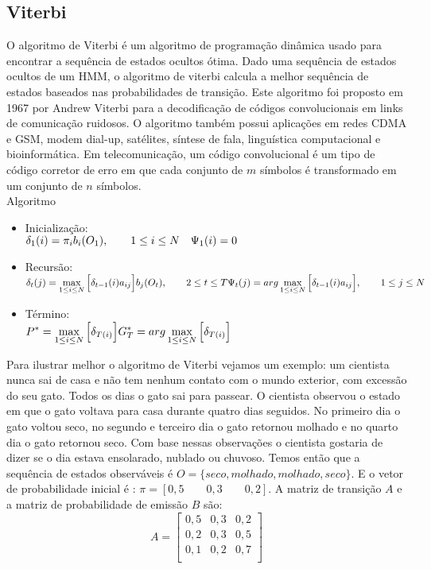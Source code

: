 \subsection{Viterbi}
\label{secViterbi}
O algoritmo de Viterbi é um algoritmo de programação dinâmica usado para encontrar a sequência de estados ocultos ótima. Dado uma sequência de estados ocultos de um HMM, o algoritmo de viterbi calcula a melhor sequência de estados baseados nas probabilidades de transição. Este algoritmo foi proposto em 1967 por Andrew Viterbi para a decodificação de códigos convolucionais em links de comunicação ruidosos.  O algoritmo também possui aplicações  em redes CDMA e GSM, modem dial-up, satélites, síntese de fala, linguística computacional e bioinformática. Em telecomunicação, um código convolucional é um tipo de código corretor de erro em que cada conjunto de $m$ símbolos é transformado em um conjunto de $n$ símbolos.\\
Algoritmo
\begin{itemize}
\item Inicialização:\\
$
\delta_1 (i) = \pi_i b_i (O_1), \qquad 1 \leq i \leq N \\
\quad \Psi_1 (i) = 0
$

\item Recursão:\\
$
\displaystyle \delta_t (j) = \max\limits_{1 \leq i \leq N} \Big[\delta_{t-1}(i) a_{ij} \Big]b_j (O_t), \qquad 2 \leq t \leq T\\
\displaystyle \Psi_t (j) = arg\max\limits_{1 \leq i \leq N}\Big[\delta_{t-1} (i)a_{ij}\Big], \qquad 1\leq j \leq N
$

\item Término:\\
$
\displaystyle P^* =\max\limits_{1 \leq i \leq N}  \Big[\delta_{T(i)}\Big] \\
\displaystyle G^*_T = arg\max\limits_{1 \leq i \leq N}  \Big[\delta_{T(i)}\Big]
$

\end{itemize}

\quad Para ilustrar melhor o algoritmo de Viterbi vejamos um exemplo: um cientista nunca sai de casa e não tem nenhum contato com o mundo exterior, com excessão do seu gato. 
Todos os dias o gato sai para passear. O cientista observou o estado em que o gato voltava para casa durante quatro dias seguidos. No primeiro dia o gato voltou seco, no segundo e terceiro dia o gato retornou molhado e no quarto dia o gato retornou seco. Com base nessas observações o cientista gostaria de dizer se o dia estava ensolarado, nublado ou chuvoso. Temos então que a sequência de estados observáveis é  $O = \{seco, molhado, molhado, seco\}$. E o vetor de probabilidade inicial é : $\pi = [0,5 \qquad 0,3 \qquad 0,2]$. A matriz de transição $A$ e a matriz de probabilidade de emissão $B$ são:
$$A=\left[ \begin{array}{lll}
 0,5 & 0,3 & 0,2\\
 0,2 & 0,3 & 0,5\\
 0,1 & 0,2 & 0,7\\
 \end{array} \right]$$

